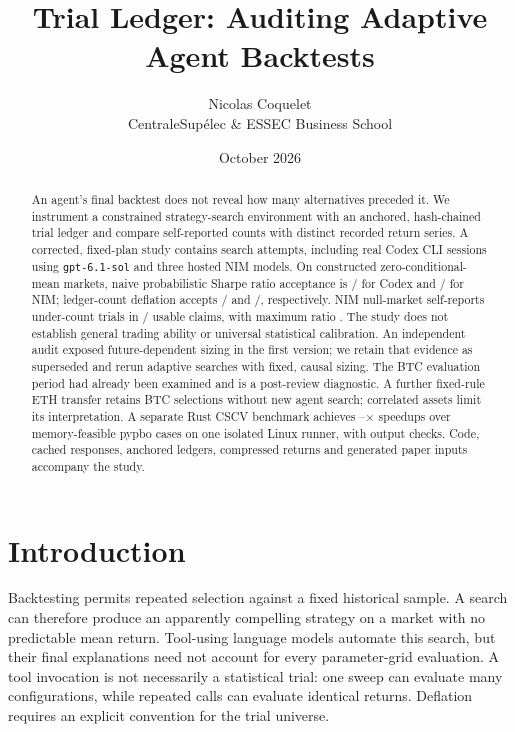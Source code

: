 \documentclass[11pt]{article}
\title{Trial Ledger: Auditing Adaptive Agent Backtests}
\author{Nicolas Coquelet\\CentraleSupélec \& ESSEC Business School}
\date{October 2026}
\begin{document}
\maketitle
\begin{abstract}
An agent's final backtest does not reveal how many alternatives preceded it.
We instrument a constrained strategy-search environment with an anchored,
hash-chained trial ledger and compare self-reported counts with distinct
recorded return series. A corrected, fixed-plan study contains
\CorrectedEpisodes{} search attempts, including \CliTotal{} real Codex CLI
sessions using \texttt{gpt-6.1-sol} and three hosted NIM models. On constructed
zero-conditional-mean markets, naive probabilistic Sharpe ratio acceptance is
\CliNaive/\CliValidNull{} for Codex and \NimNaive/\NimValidNull{} for NIM;
ledger-count deflation accepts \CliLedger/\CliValidNull{} and
\NimLedger/\NimValidNull{}, respectively. NIM null-market self-reports under-count trials in
\NimUnder/\NimClaims{} usable claims, with maximum ratio \MaxUnder{}.
\PrimaryDecisionSentence{}
The study does not establish general trading ability or universal statistical
calibration. An independent audit exposed future-dependent sizing in the first
version; we retain that evidence as superseded and rerun adaptive searches with
fixed, causal sizing. The BTC evaluation period had already been examined and
is a post-review diagnostic. A further fixed-rule ETH transfer retains
\EthSelections{} BTC selections without new agent search; correlated assets
limit its interpretation. A separate Rust CSCV benchmark achieves
\SpeedLow--\SpeedHigh$\times$ speedups over memory-feasible pypbo cases on one
isolated Linux runner, with output checks. Code, cached responses, anchored
ledgers, compressed returns and generated paper inputs accompany the study.
\end{abstract}

\section{Introduction}
Backtesting permits repeated selection against a fixed historical sample.
A search can therefore produce an apparently compelling strategy on a market
with no predictable mean return. Tool-using language models automate this
search, but their final explanations need not account for every parameter-grid
evaluation. A tool invocation is not necessarily a statistical trial: one sweep
can evaluate many configurations, while repeated calls can evaluate identical
returns. Deflation requires an explicit convention for the trial universe.
\end{document}
